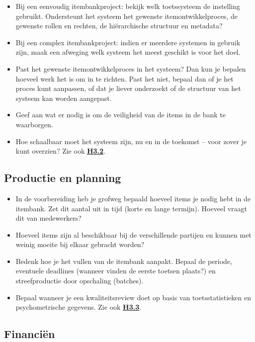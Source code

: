\documentclass[
]{book}
\providecommand{\tightlist}{%
  \setlength{\itemsep}{0pt}\setlength{\parskip}{0pt}}
\begin{document}
\begin{itemize}
\tightlist
\item
  Bij een eenvoudig itembankproject: bekijk welk toetssysteem de instelling gebruikt. Ondersteunt het systeem het gewenste itemontwikkelproces, de gewenste rollen en rechten, de hiërarchische structuur en metadata?
\item
  Bij een complex itembankproject: indien er meerdere systemen in gebruik zijn, maak een afweging welk systeem het meest geschikt is voor het doel.
\item
  Past het gewenste itemontwikkelproces in het systeem? Dan kun je bepalen hoeveel werk het is om in te richten. Past het niet, bepaal dan of je het proces kunt aanpassen, of dat je liever onderzoekt of de structuur van het systeem kan worden aangepast.
\item
  Geef aan wat er nodig is om de veiligheid van de items in de bank te waarborgen.
\item
  Hoe schaalbaar moet het systeem zijn, nu en in de toekomst -- voor zover je kunt overzien? Zie ook \textbf{\protect\hyperlink{technologie-systemen}{H3.2}}.
\end{itemize}

\hypertarget{productie-en-planning}{%
\subsection{Productie en planning}\label{productie-en-planning}}

\begin{itemize}
\tightlist
\item
  In de voorbereiding heb je grofweg bepaald hoeveel items je nodig hebt in de itembank. Zet dit aantal uit in tijd (korte en lange termijn). Hoeveel vraagt dit van medewerkers?
\item
  Hoeveel items zijn al beschikbaar bij de verschillende partijen en kunnen met weinig moeite bij elkaar gebracht worden?
\item
  Bedenk hoe je het vullen van de itembank aanpakt. Bepaal de periode, eventuele deadlines (wanneer vinden de eerste toetsen plaats?) en streefproductie door opschaling (batches).
\item
  Bepaal wanneer je een kwaliteitsreview doet op basis van toetsstatistieken en psychometrische gegevens. Zie ook \textbf{\protect\hyperlink{omvang-van-de-itembank}{H3.3}}.
\end{itemize}

\hypertarget{financiuxebn}{%
\subsection{Financiën}\label{financiuxebn}}
\end{document}
